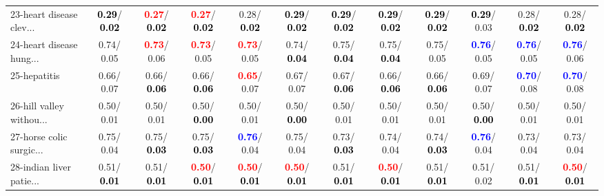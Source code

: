 \begin{table}[h]
\begin{center}
{\begin{tabular}{lc|c|c|c|c|c|c|c|c|c|c}
23-heart disease clev... & \textcolor{black}{\textbf{  0.29}}/\textcolor{black}{\textbf{  0.02}} & \textcolor{red}{\textbf{  0.27}}/\textcolor{black}{\textbf{  0.02}} & \textcolor{red}{\textbf{  0.27}}/\textcolor{black}{\textbf{  0.02}} &   0.28/\textcolor{black}{\textbf{  0.02}} & \textcolor{black}{\textbf{  0.29}}/\textcolor{black}{\textbf{  0.02}} & \textcolor{black}{\textbf{  0.29}}/\textcolor{black}{\textbf{  0.02}} & \textcolor{black}{\textbf{  0.29}}/\textcolor{black}{\textbf{  0.02}} & \textcolor{black}{\textbf{  0.29}}/\textcolor{black}{\textbf{  0.02}} & \textcolor{black}{\textbf{  0.29}}/  0.03 &   0.28/\textcolor{black}{\textbf{  0.02}} &   0.28/\textcolor{black}{\textbf{  0.02}} \\
24-heart disease hung... &   0.74/  0.05 & \textcolor{red}{\textbf{  0.73}}/  0.06 & \textcolor{red}{\textbf{  0.73}}/  0.05 & \textcolor{red}{\textbf{  0.73}}/  0.05 &   0.74/\textcolor{black}{\textbf{  0.04}} &   0.75/\textcolor{black}{\textbf{  0.04}} &   0.75/\textcolor{black}{\textbf{  0.04}} &   0.75/  0.05 & \textcolor{blue}{\textbf{  0.76}}/  0.05 & \textcolor{blue}{\textbf{  0.76}}/  0.05 & \textcolor{blue}{\textbf{  0.76}}/  0.06 \\
25-hepatitis &   0.66/  0.07 &   0.66/\textcolor{black}{\textbf{  0.06}} &   0.66/\textcolor{black}{\textbf{  0.06}} & \textcolor{red}{\textbf{  0.65}}/  0.07 &   0.67/  0.07 &   0.67/\textcolor{black}{\textbf{  0.06}} &   0.66/\textcolor{black}{\textbf{  0.06}} &   0.66/\textcolor{black}{\textbf{  0.06}} &   0.69/  0.07 & \textcolor{blue}{\textbf{  0.70}}/  0.08 & \textcolor{blue}{\textbf{  0.70}}/  0.08 \\
26-hill valley withou... &   0.50/  0.01 &   0.50/  0.01 &   0.50/\textcolor{black}{\textbf{  0.00}} &   0.50/  0.01 &   0.50/\textcolor{black}{\textbf{  0.00}} &   0.50/  0.01 &   0.50/  0.01 &   0.50/  0.01 &   0.50/\textcolor{black}{\textbf{  0.00}} &   0.50/  0.01 &   0.50/  0.01 \\
27-horse colic surgic... &   0.75/  0.04 &   0.75/\textcolor{black}{\textbf{  0.03}} &   0.75/\textcolor{black}{\textbf{  0.03}} & \textcolor{blue}{\textbf{  0.76}}/  0.04 &   0.75/  0.04 &   0.73/\textcolor{black}{\textbf{  0.03}} &   0.74/  0.04 &   0.74/\textcolor{black}{\textbf{  0.03}} & \textcolor{blue}{\textbf{  0.76}}/  0.04 &   0.73/  0.04 &   0.73/  0.04 \\
28-indian liver patie... &   0.51/\textcolor{black}{\textbf{  0.01}} &   0.51/\textcolor{black}{\textbf{  0.01}} & \textcolor{red}{\textbf{  0.50}}/\textcolor{black}{\textbf{  0.01}} & \textcolor{red}{\textbf{  0.50}}/\textcolor{black}{\textbf{  0.01}} & \textcolor{red}{\textbf{  0.50}}/\textcolor{black}{\textbf{  0.01}} &   0.51/\textcolor{black}{\textbf{  0.01}} & \textcolor{red}{\textbf{  0.50}}/\textcolor{black}{\textbf{  0.01}} &   0.51/\textcolor{black}{\textbf{  0.01}} &   0.51/  0.02 &   0.51/\textcolor{black}{\textbf{  0.01}} & \textcolor{red}{\textbf{  0.50}}/\textcolor{black}{\textbf{  0.01}} \\ \hline

\end{tabular}}
\end{center}
\end{table}
